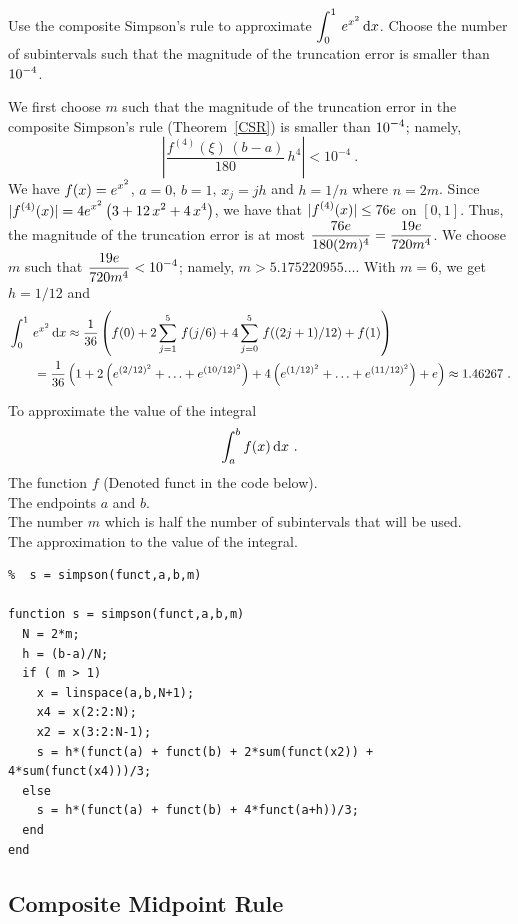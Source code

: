 \begin{egg}
Use the composite Simpson's rule to approximate
$\displaystyle \int_0^1\,e^{x^2}\,\mathrm{d}x$.  Choose
the number of subintervals such that the magnitude of the truncation
error is smaller than $\displaystyle 10^{-4}$.

We first choose $m$ such that the magnitude of the truncation error in
the composite Simpson's rule (Theorem~\ref{CSR}) is smaller than
$\displaystyle 10^{-4}$; namely,
\[
\left| \frac{f^{(4)}(\xi)\,(b-a)}{180}\,h^4 \right| < 10^{-4} \ .
\]
We have $\displaystyle f(x)=e^{x^2}$, $a=0$, $b=1$, $x_j = jh$ and
$h = 1/n$ where $n=2m$.  Since
$\displaystyle |f^{(4)}(x)|=
4e^{x^2}\left( 3 + 12\,x^2 + 4\,x^4 \right)$, we have 
that $\displaystyle |f^{(4)}(x)| \leq 76e$ on $[0,1]$.  Thus, the
magnitude of the truncation error is at most
$\displaystyle \frac{76e}{180(2m)^4} = \frac{19e}{720 m^4}$.  We
choose $m$ such that $\displaystyle \frac{19e}{720 m^4} < 10^{-4}$;
namely, $m > 5.175220955\ldots$.  With $m=6$, we get $h=1/12$
and
\begin{align*}
&\int_0^1\,e^{x^2}\,\mathrm{d}x \approx
\frac{1}{36}\left(f(0) + 2\sum_{j=1}^{5}\,f(j/6)
+ 4 \sum_{j=0}^{5}\,f((2j+1)/12) + f(1) \right) \\
&\qquad
= \frac{1}{36}\left( 1 + 2\left(e^{(2/12)^2} + \ldots + e^{(10/12)^2}\right)
+ 4\left( e^{(1/12)^2} + \ldots + e^{(11/12)^2}\right) +e \right)
\approx 1.46267 \ .
\end{align*}
\label{S1}
\end{egg}

\begin{code}
To approximate the value  of the integral
\[
  \int_{a}^{b}f(x)\,\mathrm{d}x \ .
\]
 The function $f$ (Denoted funct in the code below).\\
The endpoints $a$ and $b$.\\
The number $m$ which is half the number of subintervals that will be
used.\\
 The approximation to the value of the integral.
\small
\begin{verbatim}
%  s = simpson(funct,a,b,m)

function s = simpson(funct,a,b,m)
  N = 2*m;
  h = (b-a)/N;
  if ( m > 1)
    x = linspace(a,b,N+1);
    x4 = x(2:2:N);
    x2 = x(3:2:N-1);
    s = h*(funct(a) + funct(b) + 2*sum(funct(x2)) + 4*sum(funct(x4)))/3;
  else
    s = h*(funct(a) + funct(b) + 4*funct(a+h))/3;
  end
end
\end{verbatim}
\end{code}

\subsection{Composite Midpoint Rule}

